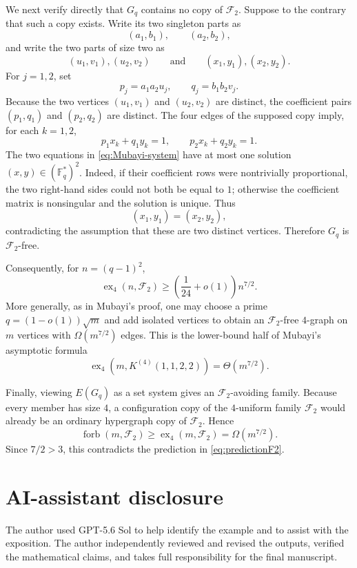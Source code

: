 \documentclass[11pt]{article}
\theoremstyle{definition}
\newcommand{\forb}{\operatorname{forb}}
\newcommand{\ex}{\operatorname{ex}}
\newcommand{\cF}{\mathcal F}
\begin{document}
	We next verify directly that $G_q$ contains no copy of $\cF_2$. Suppose
	to the contrary that such a copy exists. Write its two singleton parts
	as
	\[
	(a_1,b_1),\qquad (a_2,b_2),
	\]
	and write the two parts of size two as
	\[
	(u_1,v_1),(u_2,v_2)
	\qquad\text{and}\qquad
	(x_1,y_1),(x_2,y_2).
	\]
	For $j=1,2$, set
	\[
	p_j=a_1a_2u_j,\qquad q_j=b_1b_2v_j.
	\]
	Because the two vertices $(u_1,v_1)$ and $(u_2,v_2)$ are distinct, the
	coefficient pairs $(p_1,q_1)$ and $(p_2,q_2)$ are distinct. The four
	edges of the supposed copy imply, for each $k=1,2$,
	\begin{equation}\label{eq:Mubayi-system}
		p_1x_k+q_1y_k=1,
		\qquad
		p_2x_k+q_2y_k=1.
	\end{equation}
	The two equations in \eqref{eq:Mubayi-system} have at most one solution
	$(x,y)\in(\mathbb F_q^\ast)^2$. Indeed, if their coefficient rows were
	nontrivially proportional, the two right-hand sides could not both be
	equal to $1$; otherwise the coefficient matrix is nonsingular and the
	solution is unique. Thus
	\[
	(x_1,y_1)=(x_2,y_2),
	\]
	contradicting the assumption that these are two distinct vertices.
	Therefore $G_q$ is $\cF_2$-free.
	
	Consequently, for $n=(q-1)^2$,
	\[
	\ex_4(n,\cF_2)
	\ge
	\left(\frac{1}{24}+o(1)\right)n^{7/2}.
	\]
	More generally, as in Mubayi's proof, one may choose a prime
	$q=(1-o(1))\sqrt m$ and add isolated vertices to obtain an
	$\cF_2$-free $4$-graph on $m$ vertices with $\Omega(m^{7/2})$ edges.
	This is the lower-bound half of Mubayi's asymptotic formula
	\[
	\ex_4\!\left(m,K^{(4)}(1,1,2,2)\right)
	=
	\Theta(m^{7/2}).
	\]
	
	Finally, viewing $E(G_q)$ as a set system gives an
	$\cF_2$-avoiding family. Because every member has size $4$, a
	configuration copy of the $4$-uniform family $\cF_2$ would already be an
	ordinary hypergraph copy of $\cF_2$. Hence
	\[
	\forb(m,\cF_2)
	\ge
	\ex_4(m,\cF_2)
	=
	\Omega(m^{7/2}).
	\]
	Since $7/2>3$, this contradicts the prediction in
	\eqref{eq:predictionF2}.
	
	\section{AI-assistant disclosure}
	
	The author used GPT-5.6 Sol to help identify the example and to assist with
	the exposition. The author independently reviewed and revised the outputs,
	verified the mathematical claims, and takes full responsibility for the final
	manuscript.
	
\end{document}
